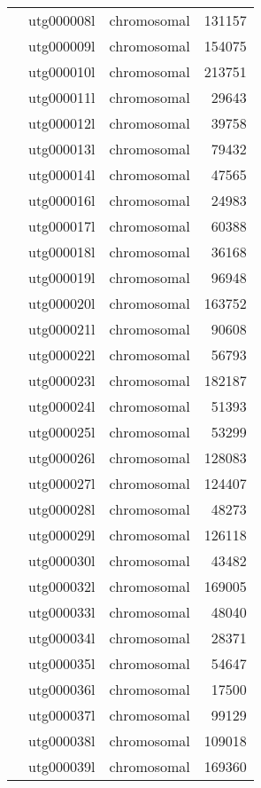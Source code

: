 {\begin{supertabular}{llcr}
         & utg000008l & chromosomal & 131157 \\
         & utg000009l & chromosomal & 154075 \\
         & utg000010l & chromosomal & 213751 \\
         & utg000011l & chromosomal & 29643 \\
         & utg000012l & chromosomal & 39758 \\
         & utg000013l & chromosomal & 79432 \\
         & utg000014l & chromosomal & 47565 \\
         & utg000016l & chromosomal & 24983 \\
         & utg000017l & chromosomal & 60388 \\
         & utg000018l & chromosomal & 36168 \\
         & utg000019l & chromosomal & 96948 \\
         & utg000020l & chromosomal & 163752 \\
         & utg000021l & chromosomal & 90608 \\
         & utg000022l & chromosomal & 56793 \\
         & utg000023l & chromosomal & 182187 \\
         & utg000024l & chromosomal & 51393 \\
         & utg000025l & chromosomal & 53299 \\
         & utg000026l & chromosomal & 128083 \\
         & utg000027l & chromosomal & 124407 \\
         & utg000028l & chromosomal & 48273 \\
         & utg000029l & chromosomal & 126118 \\
         & utg000030l & chromosomal & 43482 \\
         & utg000032l & chromosomal & 169005 \\
         & utg000033l & chromosomal & 48040 \\
         & utg000034l & chromosomal & 28371 \\
         & utg000035l & chromosomal & 54647 \\
         & utg000036l & chromosomal & 17500 \\
         & utg000037l & chromosomal & 99129 \\
         & utg000038l & chromosomal & 109018 \\
         & utg000039l & chromosomal & 169360 \\

\end{supertabular}}
